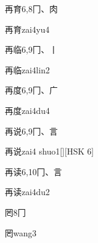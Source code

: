 \begin{Entry}{再育}{6,8}{⼌、⾁}
  \begin{Phonetics}{再育}{zai4yu4}
  \end{Phonetics}
\end{Entry}

\begin{Entry}{再临}{6,9}{⼌、⼁}
  \begin{Phonetics}{再临}{zai4lin2}
  \end{Phonetics}
\end{Entry}

\begin{Entry}{再度}{6,9}{⼌、⼴}
  \begin{Phonetics}{再度}{zai4du4}
  \end{Phonetics}
\end{Entry}

\begin{Entry}{再说}{6,9}{⼌、⾔}
  \begin{Phonetics}{再说}{zai4 shuo1}[][HSK 6]
  \end{Phonetics}
\end{Entry}

\begin{Entry}{再读}{6,10}{⼌、⾔}
  \begin{Phonetics}{再读}{zai4du2}
  \end{Phonetics}
\end{Entry}

\begin{Entry}{罔}{8}{⼌}
  \begin{Phonetics}{罔}{wang3}
  \end{Phonetics}
\end{Entry}



